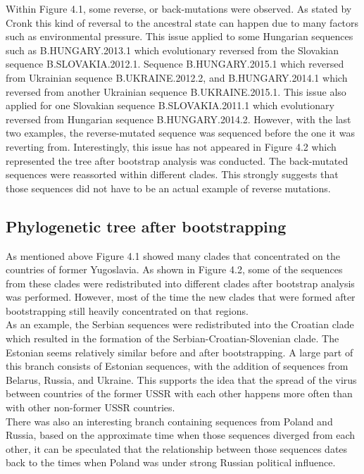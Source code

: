 Within Figure 4.1, some reverse, or back-mutations were observed. 
As stated by \cite{cronk_2009_evolution} Cronk this kind of reversal to the ancestral state can happen due to many factors such as environmental pressure. 
This issue applied to some Hungarian sequences such as B.HUNGARY.2013.1 which evolutionary reversed from the Slovakian sequence B.SLOVAKIA.2012.1.
Sequence B.HUNGARY.2015.1 which reversed from Ukrainian sequence B.UKRAINE.2012.2, and B.HUNGARY.2014.1 which reversed from another Ukrainian sequence B.UKRAINE.2015.1. 
This issue also applied for one Slovakian sequence B.SLOVAKIA.2011.1 which evolutionary reversed from Hungarian sequence B.HUNGARY.2014.2.
However, with the last two examples, the reverse-mutated sequence was sequenced before the one it was reverting from. 
Interestingly, this issue has not appeared in Figure 4.2 which represented the tree after bootstrap analysis was conducted. 
The back-mutated sequences were reassorted within different clades. 
This strongly suggests that those sequences did not have to be an actual example of reverse mutations. 

\subsection{Phylogenetic tree after bootstrapping}

As mentioned above Figure 4.1 showed many clades that concentrated on the countries of former Yugoslavia. 
As shown in Figure 4.2, some of the sequences from these clades were redistributed into different clades after bootstrap analysis was performed. 
However, most of the time the new clades that were formed after bootstrapping still heavily concentrated on that regions. \\
As an example, the Serbian sequences were redistributed into the Croatian clade which resulted in the formation of the Serbian-Croatian-Slovenian clade. 
The Estonian seems relatively similar before and after bootstrapping. 
A large part of this branch consists of Estonian sequences, with the addition of sequences from Belarus, Russia, and Ukraine. 
This supports the idea that the spread of the virus between countries of the former USSR with each other happens more often than with other non-former USSR countries. \\
There was also an interesting branch containing sequences from Poland and Russia, based on the approximate time when those sequences diverged from each other, it can be speculated that the relationship between those sequences dates back to the times when Poland was under strong Russian political influence.  


